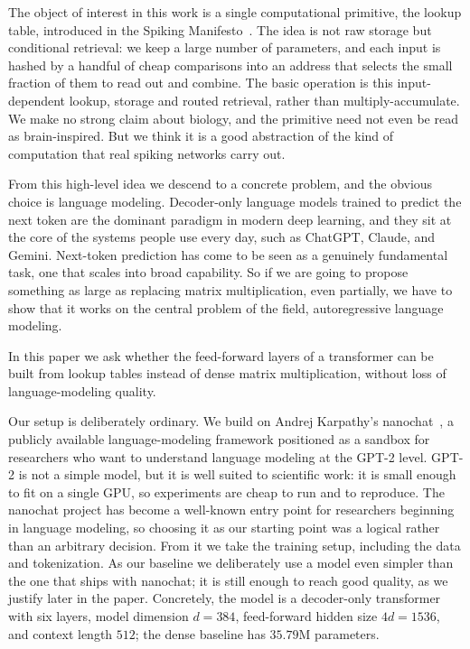 \documentclass[11pt]{article}
\begin{document}
The object of interest in this work is a single computational primitive, the lookup table,
introduced in the Spiking Manifesto~\cite{manifesto}. The idea is not raw storage but conditional retrieval: we keep a large number of parameters, and
each input is hashed by a handful of cheap comparisons into an address that selects the small
fraction of them to read out and combine. The basic operation is this input-dependent lookup,
storage and routed retrieval, rather than multiply-accumulate. We make no strong claim about biology,
and the primitive need not even be read as brain-inspired. But we think it is a good abstraction of
the kind of computation that real spiking networks carry out.

From this high-level idea we descend to a concrete problem, and the obvious choice is language
modeling. Decoder-only language models trained to predict the next token are the dominant paradigm
in modern deep learning, and they sit at the core of the systems people use every day, such as ChatGPT, Claude,
and Gemini. Next-token prediction has come to be seen as a genuinely fundamental task, one that
scales into broad capability. So if we are going to propose something as large as replacing matrix
multiplication, even partially, we have to show that it works on the central problem of the field,
autoregressive language modeling.

In this paper we ask whether the feed-forward layers of a
transformer can be built from lookup tables instead of dense matrix multiplication, without loss of
language-modeling quality.

Our setup is deliberately ordinary. We build on Andrej Karpathy's nanochat~\cite{nanochat}, a
publicly available language-modeling framework positioned as a sandbox for researchers who want to
understand language modeling at the GPT-2 level. GPT-2 is not a simple model, but it is well suited
to scientific work: it is small enough to fit on a single GPU, so experiments are cheap to run and
to reproduce. The nanochat project has become a well-known entry point for researchers beginning in
language modeling, so choosing it as our starting point was a logical rather than an arbitrary decision. From it we
take the training setup, including the data and tokenization. As our baseline we deliberately use a
model even simpler than the one that ships with nanochat; it is still enough to reach good quality,
as we justify later in the paper. Concretely, the model is a decoder-only transformer with six
layers, model dimension $d=384$, feed-forward hidden size $4d=1536$, and context length $512$; the
dense baseline has $35.79$M parameters.
\end{document}
